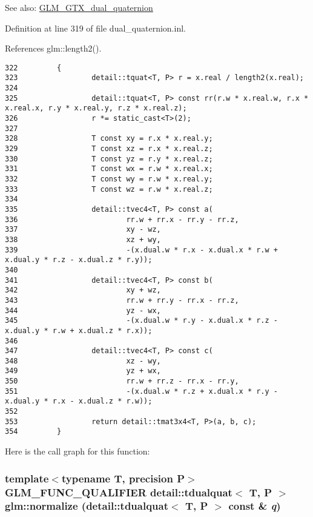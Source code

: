 \begin{Desc}
\item[See also:]\hyperlink{group__gtc__dual__quaternion}{GLM\_\-GTX\_\-dual\_\-quaternion} \end{Desc}


Definition at line 319 of file dual\_\-quaternion.inl.

References glm::length2().

\begin{Code}\begin{verbatim}322         {
323                 detail::tquat<T, P> r = x.real / length2(x.real);
324                 
325                 detail::tquat<T, P> const rr(r.w * x.real.w, r.x * x.real.x, r.y * x.real.y, r.z * x.real.z);
326                 r *= static_cast<T>(2);
327                 
328                 T const xy = r.x * x.real.y;
329                 T const xz = r.x * x.real.z;
330                 T const yz = r.y * x.real.z;
331                 T const wx = r.w * x.real.x;
332                 T const wy = r.w * x.real.y;
333                 T const wz = r.w * x.real.z;
334                 
335                 detail::tvec4<T, P> const a(
336                         rr.w + rr.x - rr.y - rr.z,
337                         xy - wz,
338                         xz + wy,
339                         -(x.dual.w * r.x - x.dual.x * r.w + x.dual.y * r.z - x.dual.z * r.y));
340                 
341                 detail::tvec4<T, P> const b(
342                         xy + wz,
343                         rr.w + rr.y - rr.x - rr.z,
344                         yz - wx,
345                         -(x.dual.w * r.y - x.dual.x * r.z - x.dual.y * r.w + x.dual.z * r.x));
346                 
347                 detail::tvec4<T, P> const c(
348                         xz - wy,
349                         yz + wx,
350                         rr.w + rr.z - rr.x - rr.y,
351                         -(x.dual.w * r.z + x.dual.x * r.y - x.dual.y * r.x - x.dual.z * r.w));
352                 
353                 return detail::tmat3x4<T, P>(a, b, c);
354         }
\end{verbatim}
\end{Code}




Here is the call graph for this function:\hypertarget{group__gtc__dual__quaternion_g861508468b4982401f1ae5b4919c5678}{
\subsubsection[normalize]{\setlength{\rightskip}{0pt plus 5cm}template$<$typename T, precision P$>$ GLM\_\-FUNC\_\-QUALIFIER detail::tdualquat$<$ T, P $>$ glm::normalize (detail::tdualquat$<$ T, P $>$ const \& {\em q})}}
\label{group__gtc__dual__quaternion_g861508468b4982401f1ae5b4919c5678}


